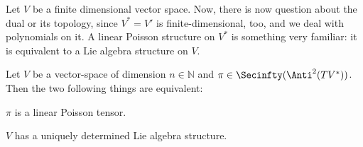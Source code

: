 Let $V$ be a finite dimensional vector space. Now, there is now question 
about the dual or its topology, since $V^* = V'$ is finite-dimensional, 
too, and we deal with polynomials on it. A linear Poisson structure on 
$V^*$ is something very familiar: it is equivalent to a Lie algebra 
structure on $V$.
\begin{proposition}
	\label{Alg:Prop:LinPoissonIsLieAlg}
	Let $V$ be a vector-space of dimension $n \in \mathbb{N}$ and $\pi \in 
	\Secinfty(\Anti^2(TV^*))$. Then the two following things are 
	equivalent:
	\begin{propositionlist}
		\item
		$\pi$ is a linear Poisson tensor.
		
		\item
		$V$ has a uniquely determined Lie algebra structure.
	\end{propositionlist}
\end{proposition}
